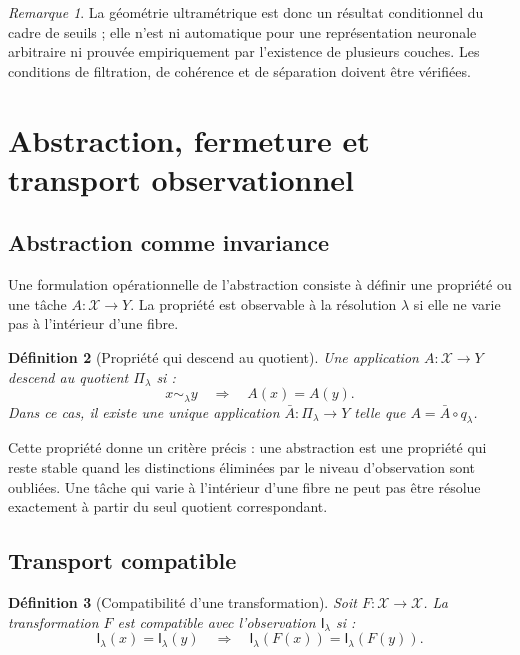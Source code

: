 \documentclass[11pt,a4paper]{article}
\newtheorem{definition}{Définition}[section]
\theoremstyle{remark}
\newtheorem{remark}[definition]{Remarque}
\newcommand{\X}{\mathcal X}
\newcommand{\Emp}{\mathsf I}
\newcommand{\1}{\mathbf 1}
\begin{document}
\begin{remark}
La géométrie ultramétrique est donc un résultat conditionnel du cadre de seuils ; elle n'est ni automatique pour une représentation neuronale arbitraire ni prouvée empiriquement par l'existence de plusieurs couches. Les conditions de filtration, de cohérence et de séparation doivent être vérifiées.
\end{remark}

\section{Abstraction, fermeture et transport observationnel}

\subsection{Abstraction comme invariance}
Une formulation opérationnelle de l'abstraction consiste à définir une propriété ou une tâche $A:\X\to Y$. La propriété est observable à la résolution $\lambda$ si elle ne varie pas à l'intérieur d'une fibre.

\begin{definition}[Propriété qui descend au quotient]
Une application $A:\X\to Y$ descend au quotient $\Pi_\lambda$ si :
\[
x\sim_\lambda y\quad\Longrightarrow\quad A(x)=A(y).
\]
Dans ce cas, il existe une unique application $\bar A:\Pi_\lambda\to Y$ telle que $A=\bar A\circ q_\lambda$.
\end{definition}

Cette propriété donne un critère précis : une abstraction est une propriété qui reste stable quand les distinctions éliminées par le niveau d'observation sont oubliées. Une tâche qui varie à l'intérieur d'une fibre ne peut pas être résolue exactement à partir du seul quotient correspondant.

\subsection{Transport compatible}
\begin{definition}[Compatibilité d'une transformation]
Soit $F:\X\to\X$. La transformation $F$ est compatible avec l'observation $\Emp_\lambda$ si :
\[
\Emp_\lambda(x)=\Emp_\lambda(y)
\quad\Longrightarrow\quad
\Emp_\lambda(F(x))=\Emp_\lambda(F(y)).
\]
\end{definition}
\end{document}
